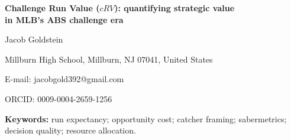 \documentclass[12pt]{article}
\begin{document}
\begin{titlepage}
  \begin{singlespace}
  \begin{center}
    \vspace*{1.5in}
    {\LARGE\bfseries Challenge Run Value ($cRV$): quantifying strategic value\\[0.5em]
     in MLB's ABS challenge era\par}
    \vfill
    {\Large Jacob Goldstein\par}
    \vspace{0.75em}
    {\large Millburn High School, Millburn, NJ 07041, United States\par}
    \vspace{0.75em}
    {\normalsize E-mail: jacobgold392@gmail.com\par}
    {\normalsize ORCID: 0009-0004-2659-1256\par}
    \vspace*{1.5in}
  \end{center}
  \end{singlespace}
\end{titlepage}

\newpage
\linenumbers

\begin{abstract}
\noindent

\end{abstract}

\vspace{1em}
\noindent\textbf{Keywords:} run expectancy; opportunity cost; catcher framing;
sabermetrics; decision quality; resource allocation.

\newpage







\end{document}
